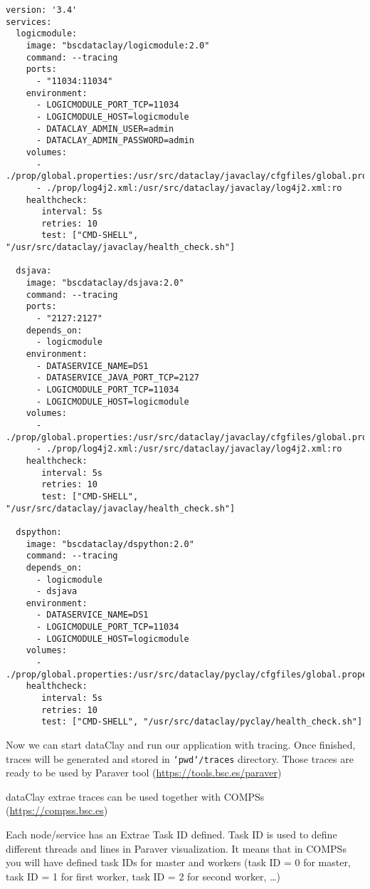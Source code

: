\begin{tBox}
 \begin{lstlisting}[language=docker-compose-2, frame=none]
version: '3.4'
services:
  logicmodule:
    image: "bscdataclay/logicmodule:2.0"
    command: --tracing
    ports:
      - "11034:11034"
    environment:
      - LOGICMODULE_PORT_TCP=11034
      - LOGICMODULE_HOST=logicmodule
      - DATACLAY_ADMIN_USER=admin
      - DATACLAY_ADMIN_PASSWORD=admin
    volumes:
      - ./prop/global.properties:/usr/src/dataclay/javaclay/cfgfiles/global.properties:ro
      - ./prop/log4j2.xml:/usr/src/dataclay/javaclay/log4j2.xml:ro
    healthcheck:
       interval: 5s
       retries: 10
       test: ["CMD-SHELL", "/usr/src/dataclay/javaclay/health_check.sh"]
         
  dsjava:
    image: "bscdataclay/dsjava:2.0"
    command: --tracing
    ports:
      - "2127:2127"
    depends_on:
      - logicmodule
    environment:
      - DATASERVICE_NAME=DS1
      - DATASERVICE_JAVA_PORT_TCP=2127
      - LOGICMODULE_PORT_TCP=11034
      - LOGICMODULE_HOST=logicmodule
    volumes:
      - ./prop/global.properties:/usr/src/dataclay/javaclay/cfgfiles/global.properties:ro
      - ./prop/log4j2.xml:/usr/src/dataclay/javaclay/log4j2.xml:ro
    healthcheck:
       interval: 5s
       retries: 10
       test: ["CMD-SHELL", "/usr/src/dataclay/javaclay/health_check.sh"]
       
  dspython:
    image: "bscdataclay/dspython:2.0"
    command: --tracing
    depends_on:
      - logicmodule
      - dsjava
    environment:
      - DATASERVICE_NAME=DS1
      - LOGICMODULE_PORT_TCP=11034
      - LOGICMODULE_HOST=logicmodule
    volumes:
      - ./prop/global.properties:/usr/src/dataclay/pyclay/cfgfiles/global.properties:ro
    healthcheck:
       interval: 5s
       retries: 10
       test: ["CMD-SHELL", "/usr/src/dataclay/pyclay/health_check.sh"]
 \end{lstlisting}
\end{tBox}

Now we can start dataClay and run our application with tracing. Once finished, traces will be generated and stored in \texttt{`pwd`/traces} directory. 
Those traces are ready to be used by Paraver tool (\href {https://tools.bsc.es/paraver} {https://tools.bsc.es/paraver})

dataClay extrae traces can be used together with COMPSs (\href {https://compss.bsc.es} {https://compss.bsc.es}) 

Each node/service has an Extrae Task ID defined. Task ID is used to define different threads and lines in Paraver visualization. It means that in COMPSs you will have defined task IDs for master and workers (task ID = 0 for master, task ID = 1 for first worker, task ID = 2 for second worker, \ldots)

